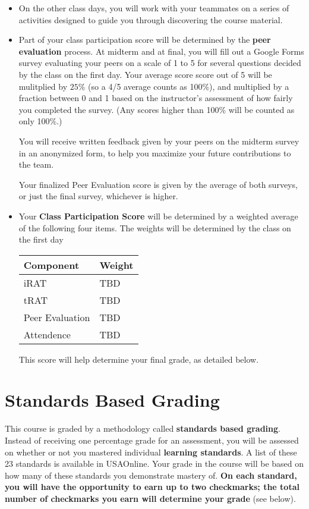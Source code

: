{\begin{itemize}
    \item On the other class days, you will work with your teammates on a series of activities designed to guide you through discovering the course material.

    \item Part of your class participation score will be determined by the {\bf peer evaluation} process.  At midterm and at final, you will fill out a Google Forms survey evaluating your peers on a scale of 1 to 5 for several questions decided by the class on the first day. Your average score score out of 5 will be mulitplied by \(25\%\) (so a 4/5 average counts as 100\%), and multiplied by a fraction between 0 and 1 based on the instructor's assessment of how fairly you completed the survey. (Any scores higher than 100\% will be counted as only 100\%.)

    You will receive written feedback given by your peers on the midterm survey in an anonymized form, to help you maximize your future contributions to the team.

    Your finalized Peer Evaluation score is given by the average of both surveys, or just the final survey, whichever is higher.

    \item Your {\bf Class Participation Score} will be determined by a weighted average of the following four items.  The weights will be determined by the class on the first day

    \begin{center}
    \begin{tabular}{l|l}
    Component & Weight \\ \hline \hline
    iRAT & TBD \\ \hline
    tRAT & TBD\\ \hline
    Peer Evaluation & TBD \\ \hline
    Attendence & TBD\\ \hline

    \end{tabular}
    \end{center}

    This score will help determine your final grade, as detailed below.
    \end{itemize}
}

\section*{\fontsize{12}{15}\selectfont Standards Based Grading}
This course is graded by a methodology called {\bf standards based grading}.  Instead of receiving one percentage grade for an assessment, you will be assessed on whether or not you mastered individual {\bf learning standards}.  A list of these 23 standards is available in USAOnline.  Your grade in the course will be based on how many of these standards you demonstrate mastery of.  {\bf On each standard, you will have the opportunity to earn up to two checkmarks; the total number of checkmarks you earn will determine your grade} (see below).


